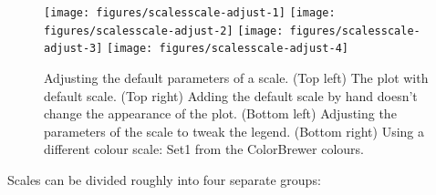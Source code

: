 \begin{Shaded}
\begin{Highlighting}[]
\StringTok{ }  
\StringTok{ }\NormalTok{()}

\StringTok{ }\NormalTok{(}\NormalTok{, }
    \NormalTok{(}\NormalTok{, }\NormalTok{, }\NormalTok{, }\NormalTok{), }
    \NormalTok{(}\NormalTok{, }\NormalTok{, }\NormalTok{, }\NormalTok{))}

\StringTok{ }\NormalTok{(} \NormalTok{)}
\end{Highlighting}
\end{Shaded}

\begin{figure}

{\centering \texttt{[image: figures/scalesscale-adjust-1]} \texttt{[image: figures/scalesscale-adjust-2]} \texttt{[image: figures/scalesscale-adjust-3]} \texttt{[image: figures/scalesscale-adjust-4]} 

}

\caption{Adjusting the default parameters of a scale. (Top left) The plot with default scale. (Top right) Adding the default scale by hand doesn't change the appearance of the plot. (Bottom left) Adjusting the parameters of the scale to tweak the legend. (Bottom right) Using a different colour scale: Set1 from the ColorBrewer colours.\label{fig:scale-adjust}}
\end{figure}


Scales can be divided roughly into four separate groups:

